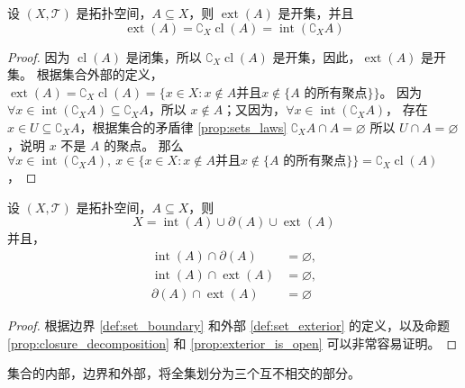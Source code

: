 \begin{proposition}[集合的外部是开集]
    设 $(X,\mathcal{T})$ 是拓扑空间，$A\subseteq X$，则 $\operatorname{ext}(A)$ 是开集，并且
    \[
        \operatorname{ext}(A) = \complement_X \operatorname{cl}(A) = \operatorname{int}(\complement_X A)
    \]
    \label{prop:exterior_is_open}
\end{proposition}
\begin{proof}
    因为 $\operatorname{cl}(A)$ 是闭集，所以 $\complement_X \operatorname{cl}(A)$ 是开集，因此，$\operatorname{ext}(A)$ 是开集。
    根据集合外部的定义，$\operatorname{ext}(A) = \complement_X \operatorname{cl}(A) = \{x\in X : x \notin A \text{并且} x\notin \{A \text{\ 的所有聚点}\}\}$。
    因为 $\forall x \in \operatorname{int}(\complement_X A) \subseteq \complement_X A$，所以 $x \notin A$；又因为，$\forall x\in \operatorname{int}(\complement_X A)$，
    存在 $ x\in U \subseteq \complement_X A$，根据集合的矛盾律 \ref{prop:sets_laws} $ \complement_X A \cap A = \varnothing$ 所以 $U \cap A = \varnothing$，说明 $x$ 不是 $A$ 的聚点。
    那么 $\forall x\in \operatorname{int}(\complement_X A),\ x\in \{x\in X : x \notin A \text{并且} x\notin \{A \text{\ 的所有聚点}\}\} = \complement_X \operatorname{cl}(A)$，
\end{proof}
\vspace{1em}

\begin{proposition}
    设 $(X,\mathcal{T})$ 是拓扑空间，$A\subseteq X$，则
    \[
        X = \operatorname{int}(A) \cup \partial(A) \cup \operatorname{ext}(A)
    \]
    并且，
    \begin{align*}
        \operatorname{int}(A) \cap \partial(A) &= \varnothing,\\
        \operatorname{int}(A) \cap \operatorname{ext}(A) &= \varnothing,\\
        \partial(A) \cap \operatorname{ext}(A) &= \varnothing
    \end{align*}
    \label{prop:topology_space_decomposition}
\end{proposition}
\begin{proof}
    根据边界 \ref{def:set_boundary} 和外部 \ref{def:set_exterior} 的定义，以及命题 \ref{prop:closure_decomposition} 和 \ref{prop:exterior_is_open} 可以非常容易证明。
\end{proof}

\begin{note}
    集合的内部，边界和外部，将全集划分为三个互不相交的部分。
\end{note}
\vspace{1em}

